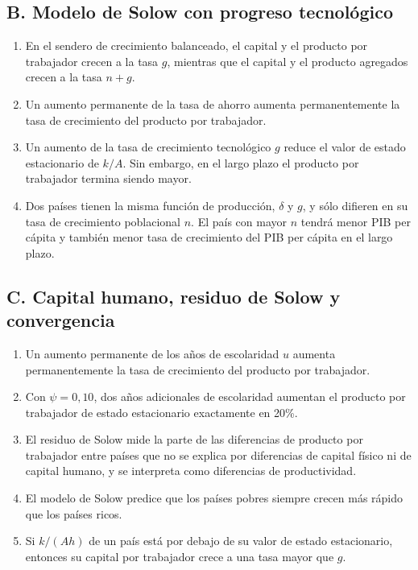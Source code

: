 \documentclass[11pt,letterpaper]{article}
\begin{document}
\subsection*{B. Modelo de Solow con progreso tecnológico}
\begin{enumerate}[resume=comentes]
  \item En el sendero de crecimiento balanceado, el capital y el producto por trabajador crecen a la tasa $g$,
  mientras que el capital y el producto agregados crecen a la tasa $n+g$.
  \item Un aumento permanente de la tasa de ahorro aumenta permanentemente la tasa de crecimiento del
  producto por trabajador.
  \item Un aumento de la tasa de crecimiento tecnológico $g$ reduce el valor de estado estacionario de $k/A$.
  Sin embargo, en el largo plazo el producto por trabajador termina siendo mayor.
  \item Dos países tienen la misma función de producción, $\delta$ y $g$, y sólo difieren en su tasa de crecimiento
  poblacional $n$. El país con mayor $n$ tendrá menor PIB per cápita y también menor tasa de crecimiento
  del PIB per cápita en el largo plazo.
\end{enumerate}

\subsection*{C. Capital humano, residuo de Solow y convergencia}
\begin{enumerate}[resume=comentes]
  \item Un aumento permanente de los años de escolaridad $u$ aumenta permanentemente la tasa de crecimiento del producto por trabajador.
  \item Con $\psi = 0{,}10$, dos años adicionales de escolaridad aumentan el producto por trabajador de estado
  estacionario exactamente en 20\%.
  \item El residuo de Solow mide la parte de las diferencias de producto por trabajador entre países que no
  se explica por diferencias de capital físico ni de capital humano, y se interpreta como diferencias de
  productividad.
  \item El modelo de Solow predice que los países pobres siempre crecen más rápido que los países ricos.
  \item Si $k/(Ah)$ de un país está por debajo de su valor de estado estacionario, entonces su capital por
  trabajador crece a una tasa mayor que $g$.
\end{enumerate}
\end{document}

